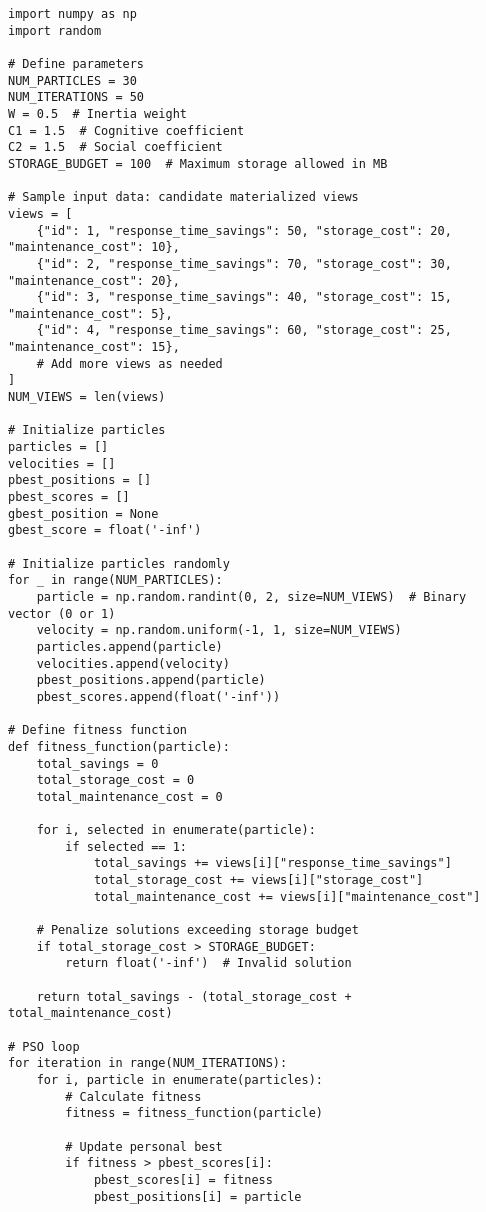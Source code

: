 \begin{lstlisting}[style=python, caption={Python Code Example}]
import numpy as np
import random

# Define parameters
NUM_PARTICLES = 30
NUM_ITERATIONS = 50
W = 0.5  # Inertia weight
C1 = 1.5  # Cognitive coefficient
C2 = 1.5  # Social coefficient
STORAGE_BUDGET = 100  # Maximum storage allowed in MB

# Sample input data: candidate materialized views
views = [
    {"id": 1, "response_time_savings": 50, "storage_cost": 20, "maintenance_cost": 10},
    {"id": 2, "response_time_savings": 70, "storage_cost": 30, "maintenance_cost": 20},
    {"id": 3, "response_time_savings": 40, "storage_cost": 15, "maintenance_cost": 5},
    {"id": 4, "response_time_savings": 60, "storage_cost": 25, "maintenance_cost": 15},
    # Add more views as needed
]
NUM_VIEWS = len(views)

# Initialize particles
particles = []
velocities = []
pbest_positions = []
pbest_scores = []
gbest_position = None
gbest_score = float('-inf')

# Initialize particles randomly
for _ in range(NUM_PARTICLES):
    particle = np.random.randint(0, 2, size=NUM_VIEWS)  # Binary vector (0 or 1)
    velocity = np.random.uniform(-1, 1, size=NUM_VIEWS)
    particles.append(particle)
    velocities.append(velocity)
    pbest_positions.append(particle)
    pbest_scores.append(float('-inf'))

# Define fitness function
def fitness_function(particle):
    total_savings = 0
    total_storage_cost = 0
    total_maintenance_cost = 0

    for i, selected in enumerate(particle):
        if selected == 1:
            total_savings += views[i]["response_time_savings"]
            total_storage_cost += views[i]["storage_cost"]
            total_maintenance_cost += views[i]["maintenance_cost"]

    # Penalize solutions exceeding storage budget
    if total_storage_cost > STORAGE_BUDGET:
        return float('-inf')  # Invalid solution

    return total_savings - (total_storage_cost + total_maintenance_cost)

# PSO loop
for iteration in range(NUM_ITERATIONS):
    for i, particle in enumerate(particles):
        # Calculate fitness
        fitness = fitness_function(particle)

        # Update personal best
        if fitness > pbest_scores[i]:
            pbest_scores[i] = fitness
            pbest_positions[i] = particle


\end{lstlisting}
